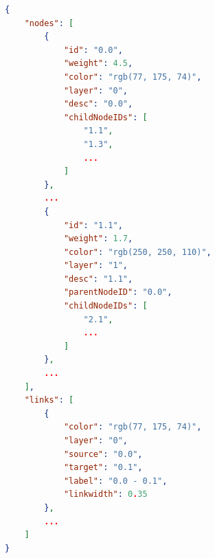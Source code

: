 \begin{lstlisting}[language=json,label={lst:internalJSON},caption={minimal JSON input data structure. The id attribute has to follow the pattern ”<layerNr>.<uniqueNodeIDByLayer>”. The desc, color and weight attribute can be set individually. Besides these required properties there can be any number of additional properties.}]
{
    "nodes": [
        {
            "id": "0.0",
            "weight": 4.5,
            "color": "rgb(77, 175, 74)",
            "layer": "0",
            "desc": "0.0",
            "childNodeIDs": [
                "1.1",
                "1.3",
                ...
            ]
        },
        ...
        {
            "id": "1.1",
            "weight": 1.7,
            "color": "rgb(250, 250, 110)",
            "layer": "1",
            "desc": "1.1",
            "parentNodeID": "0.0",
            "childNodeIDs": [
                "2.1",
                ...
            ]
        },
        ...
    ],
    "links": [
        {
            "color": "rgb(77, 175, 74)",
            "layer": "0",
            "source": "0.0",
            "target": "0.1",
            "label": "0.0 - 0.1",
            "linkwidth": 0.35
        },
        ...
    ]
}
\end{lstlisting}

